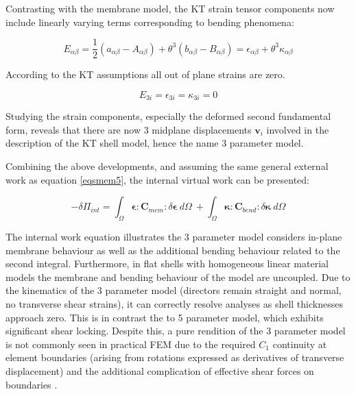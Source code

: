 Contrasting with the membrane model, the KT strain tensor components now include linearly varying terms corresponding to bending phenomena:

\begin{equation} 
E_{\alpha \beta}
= \frac{1}{2}
(a_{\alpha\beta} - A_{\alpha\beta})
+
\theta^3 (b_{\alpha\beta} - B_{\alpha\beta})
=
\epsilon_{\alpha \beta} + \theta^3 \kappa_{\alpha \beta}
\label{eqskt8}
\end{equation}

According to the KT assumptions all out of plane strains are zero.

\begin{equation} 
E_{3i} = \epsilon_{3i} = \kappa_{3i} = 0
\label{eqskt81}
\end{equation}

Studying the strain components, especially the deformed second fundamental form, reveals that there are now 3 midplane displacements $\mathbf{v}_i$ involved in the description of the KT shell model, hence the name 3 parameter model. 

Combining the above developments, and assuming the same general external work as equation \eqref{eqsmem5}, the internal virtual work can be presented:

\begin{equation} 
-\delta\Pi_{int} = 
\int_\Omega
\boldsymbol{\epsilon}
:
\mathbf{C}_{mem}
:
\delta \boldsymbol{\epsilon}\ d \Omega\ 
+
\int_\Omega
\boldsymbol{\kappa}
:
\mathbf{C}_{bend}
:
\delta \boldsymbol{\kappa}\ 
d \Omega
\label{eqskt9}
\end{equation}

The internal work equation illustrates the 3 parameter model considers in-plane membrane behaviour as well as the additional bending behaviour related to the second integral. Furthermore, in flat shells with homogeneous linear material models the membrane and bending behaviour of the model are uncoupled. Due to the kinematics of the 3 parameter model (directors remain straight and normal, no transverse shear strains), it can correctly resolve analyses as shell thicknesses approach zero. This is in contrast the to 5 parameter model, which exhibits significant shear locking. Despite this, a pure rendition of the 3 parameter model is not commonly seen in practical FEM due to the required $C_1$ continuity at element boundaries (arising from rotations expressed as derivatives of transverse displacement) and the additional complication of effective shear forces on boundaries \cite{BischLitBook04}.

